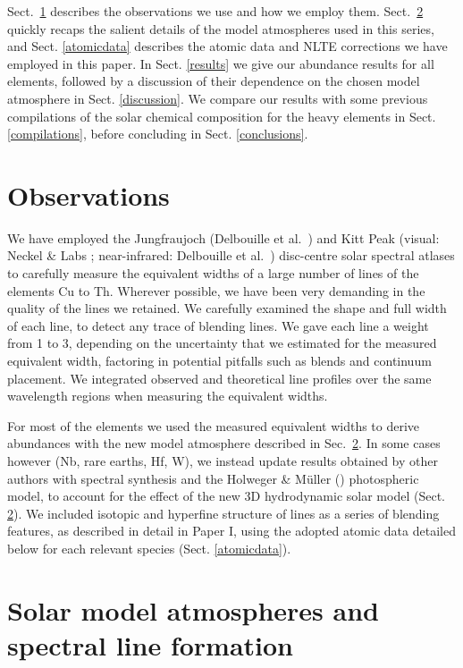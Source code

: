 \documentclass[traditabstract]{aa}
\begin{document}
Sect.~\ref{observations} describes the observations we use and how we employ them. Sect.~\ref{3Dmodel} quickly recaps the salient details of the model atmospheres used in this series, and Sect. \ref{atomicdata} describes the atomic data and NLTE corrections we have employed in this paper.  In Sect. \ref{results} we give our abundance results for all elements, followed by a discussion of their dependence on the chosen model atmosphere in Sect. \ref{discussion}. We compare our results with some previous compilations of the solar chemical composition for the heavy elements in Sect. \ref{compilations}, before concluding in Sect. \ref{conclusions}.

\section{Observations}
\label{observations}

We have employed the Jungfraujoch (Delbouille et al.\ \cite{delb1}) and Kitt Peak (visual: Neckel \& Labs \cite{neck}; near-infrared: Delbouille et al.\ \cite{delb2}) disc-centre solar spectral atlases to carefully measure the equivalent widths of a large number of lines of the elements Cu to Th. Wherever possible, we have been very demanding in the quality of the lines we retained. We carefully examined the shape and full width of each line, to detect any trace of blending lines.  We gave each line a weight from 1 to 3, depending on the uncertainty that we estimated for the measured equivalent width, factoring in potential pitfalls such as blends and continuum placement. We integrated observed and theoretical line profiles over the same wavelength regions when measuring the equivalent widths. 

For most of the elements we used the measured equivalent widths to derive abundances with the new model atmosphere described in Sec.~\ref{3Dmodel}.  In some cases however (Nb, rare earths, Hf, W), we instead update results obtained by other authors with spectral synthesis and the Holweger \& M\"{u}ller (\cite{hol}) photospheric model, to account for the effect of the new 3D hydrodynamic solar model (Sect. \ref{3Dmodel}).  We included isotopic and hyperfine structure of lines as a series of blending features, as described in detail in Paper I, using the adopted atomic data detailed below for each relevant species (Sect. \ref{atomicdata}).

\section{Solar model atmospheres and spectral line formation}
\label{3Dmodel}
\end{document}
